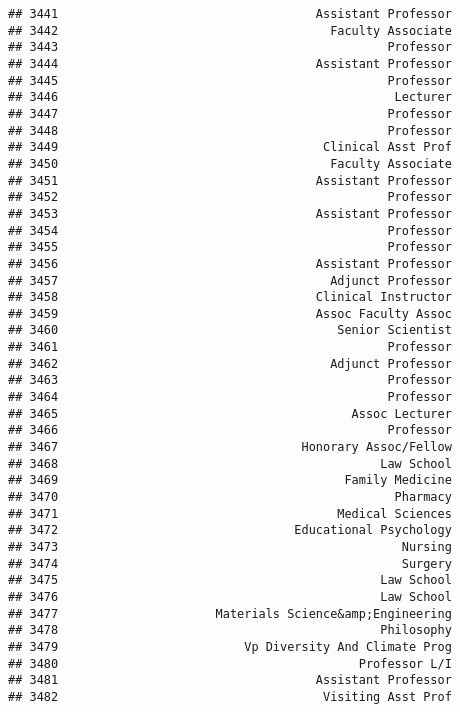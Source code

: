 \documentclass[
]{article}
\begin{document}
\begin{verbatim}
## 3441                                    Assistant Professor
## 3442                                      Faculty Associate
## 3443                                              Professor
## 3444                                    Assistant Professor
## 3445                                              Professor
## 3446                                               Lecturer
## 3447                                              Professor
## 3448                                              Professor
## 3449                                     Clinical Asst Prof
## 3450                                      Faculty Associate
## 3451                                    Assistant Professor
## 3452                                              Professor
## 3453                                    Assistant Professor
## 3454                                              Professor
## 3455                                              Professor
## 3456                                    Assistant Professor
## 3457                                      Adjunct Professor
## 3458                                    Clinical Instructor
## 3459                                    Assoc Faculty Assoc
## 3460                                       Senior Scientist
## 3461                                              Professor
## 3462                                      Adjunct Professor
## 3463                                              Professor
## 3464                                              Professor
## 3465                                         Assoc Lecturer
## 3466                                              Professor
## 3467                                  Honorary Assoc/Fellow
## 3468                                             Law School
## 3469                                        Family Medicine
## 3470                                               Pharmacy
## 3471                                       Medical Sciences
## 3472                                 Educational Psychology
## 3473                                                Nursing
## 3474                                                Surgery
## 3475                                             Law School
## 3476                                             Law School
## 3477                      Materials Science&amp;Engineering
## 3478                                             Philosophy
## 3479                          Vp Diversity And Climate Prog
## 3480                                          Professor L/I
## 3481                                    Assistant Professor
## 3482                                     Visiting Asst Prof

\end{verbatim}
\end{document}
